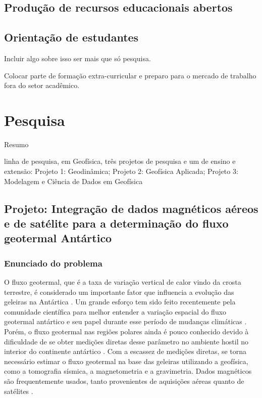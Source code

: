 \documentclass[11pt,a4paper,oneside]{book}
\begin{document}
\section{Produção de recursos educacionais abertos}


\section{Orientação de estudantes}

Incluir algo sobre isso ser mais que só pesquisa.

Colocar parte de formação extra-curricular e preparo para o mercado de trabalho
fora do setor acadêmico.

\chapter{Pesquisa}

Resumo

linha de pesquisa, em Geofísica, três projetos de pesquisa e um de ensino e
extensão: Projeto 1: Geodinâmica; Projeto 2: Geofísica Aplicada; Projeto 3: Modelagem e
Ciência de Dados em Geofísica


\section{%
  Projeto: Integração de dados magnéticos aéreos e de satélite para a
  determinação do fluxo geotermal Antártico
}

\subsection{Enunciado do problema}

O fluxo geotermal, que é a taxa de variação vertical de calor vindo da
crosta terrestre, é considerado um importante fator que influencia a evolução
das geleiras na Antártica \citep{Seroussi2017}.
Um grande esforço tem sido feito recentemente pela comunidade científica para
melhor entender a variação espacial do fluxo geotermal antártico e seu papel
durante esse período de mudanças climáticas \citep{BurtonJohnson2020}.
Porém, o fluxo geotermal nas regiões polares ainda é pouco conhecido devido à
dificuldade de se obter medições diretas desse parâmetro no ambiente hostil no
interior do continente antártico \citep{BurtonJohnson2020}.
Com a escassez de medições diretas, se torna necessário estimar o fluxo
geotermal na base das geleiras utilizando a geofísica, como a tomografia
sísmica, a magnetometria e a gravimetria.
Dados magnéticos são frequentemente usados, tanto provenientes de aquisições
aéreas \citep[e.g.,][]{Lowe2023} quanto de satélites
\citep[e.g.,][]{FoxMaule2005}.
\end{document}
